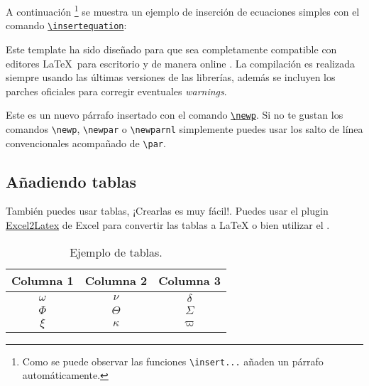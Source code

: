		A continuación \footnote{Como se puede observar las funciones \texttt{\textbackslash insert...} añaden un párrafo automáticamente.} se muestra un ejemplo de inserción de ecuaciones simples con el comando \href{https://latex.ppizarror.com/informe.html#hlp-formulae}{\texttt{\textbackslash insertequation}}:


		Este template ha sido diseñado para que sea completamente compatible con editores \LaTeX\ para escritorio y de manera online . La compilación es realizada siempre usando las últimas versiones de las librerías, además se incluyen los parches oficiales para corregir eventuales \textit{warnings}.

		\newp Este es un nuevo párrafo insertado con el comando \href{https://latex.ppizarror.com/informe.html#hlp-parrafo}{\texttt{\textbackslash newp}}. Si no te gustan los comandos \texttt{\textbackslash newp}, \texttt{\textbackslash newpar} o \texttt{\textbackslash newparnl} simplemente puedes usar los salto de línea convencionales acompañado de \texttt{\textbackslash par}.

	\subsection{Añadiendo tablas}

		También puedes usar tablas, ¡Crearlas es muy fácil!. Puedes usar el plugin \href{https://www.ctan.org/tex-archive/support/excel2latex/}{Excel2Latex} \cite{excel2latex} de Excel para convertir las tablas a \LaTeX\xspace o bien utilizar el  \cite{tablesgenerator}.

		\begin{table}[htbp]
			\centering
			\caption{Ejemplo de tablas.}
			\begin{tabular}{ccc}
				\hline
				\textbf{Columna 1} & \textbf{Columna 2} & \textbf{Columna 3} \bigstrut\\
				\hline
				$\omega$ & $\nu$ & $\delta$ \bigstrut[t]\\
				$\Phi$ & $\Theta$ & $\varSigma$ \\
				$\xi$ & $\kappa$ & $\varpi$ \bigstrut[b] \\
				\hline
			\end{tabular}
			\label{tab:tabla-1}
		\end{table}


